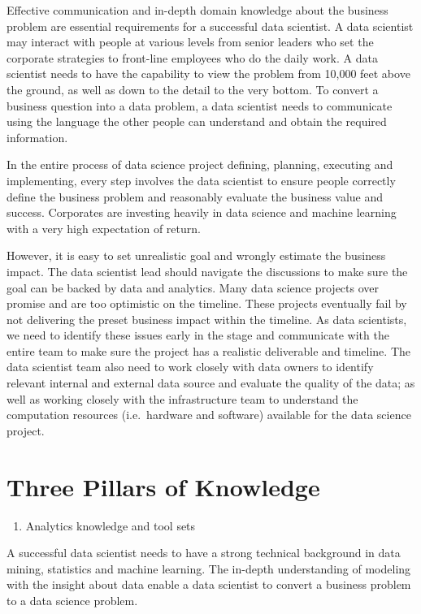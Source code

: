 \documentclass[12pt,]{krantz}
\providecommand{\tightlist}{%
  \setlength{\itemsep}{0pt}\setlength{\parskip}{0pt}}
\begin{document}
Effective communication and in-depth domain knowledge about the business problem are essential requirements for a successful data scientist. A data scientist may interact with people at various levels from senior leaders who set the corporate strategies to front-line employees who do the daily work. A data scientist needs to have the capability to view the problem from 10,000 feet above the ground, as well as down to the detail to the very bottom. To convert a business question into a data problem, a data scientist needs to communicate using the language the other people can understand and obtain the required information.

In the entire process of data science project defining, planning, executing and implementing, every step involves the data scientist to ensure people correctly define the business problem and reasonably evaluate the business value and success. Corporates are investing heavily in data science and machine learning with a very high expectation of return.

However, it is easy to set unrealistic goal and wrongly estimate the business impact. The data scientist lead should navigate the discussions to make sure the goal can be backed by data and analytics. Many data science projects over promise and are too optimistic on the timeline. These projects eventually fail by not delivering the preset business impact within the timeline. As data scientists, we need to identify these issues early in the stage and communicate with the entire team to make sure the project has a realistic deliverable and timeline. The data scientist team also need to work closely with data owners to identify relevant internal and external data source and evaluate the quality of the data; as well as working closely with the infrastructure team to understand the computation resources (i.e.~hardware and software) available for the data science project.

\hypertarget{three-pillars-of-knowledge}{%
\section{Three Pillars of Knowledge}\label{three-pillars-of-knowledge}}

\begin{enumerate}
\def\labelenumi{(\arabic{enumi})}
\tightlist
\item
  Analytics knowledge and tool sets
\end{enumerate}

A successful data scientist needs to have a strong technical background in data mining, statistics and machine learning. The in-depth understanding of modeling with the insight about data enable a data scientist to convert a business problem to a data science problem.
\end{document}
